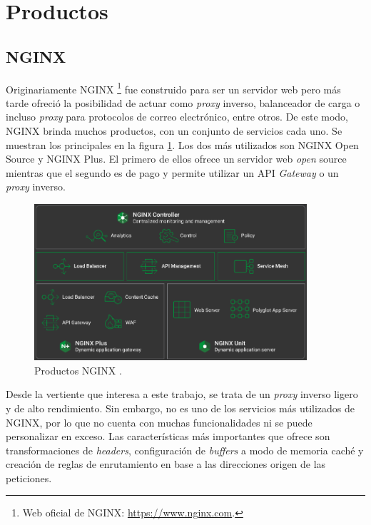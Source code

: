 \documentclass[11pt,spanish,listoffigures]{tfgetsinf}
\begin{document}

	\section{Productos}


		\subsection{NGINX}

Originariamente NGINX \footnote{Web oficial de NGINX: \url{https://www.nginx.com}.} fue construido para ser un servidor web pero más tarde ofreció la posibilidad de actuar como \emph{proxy} inverso, balanceador de carga o incluso \emph{proxy} para protocolos de correo electrónico, entre otros. De este modo, NGINX brinda muchos productos, con un conjunto de servicios cada uno. Se muestran los principales en la figura \ref{productosNGINX}. Los dos más utilizados son NGINX Open Source y NGINX Plus. El primero de ellos ofrece un servidor web \emph{open} source mientras que el segundo es de pago y permite utilizar un API \emph{Gateway} o un \emph{proxy} inverso.

\begin{figure}[ht]
\centering
\includegraphics[width=0.9\textwidth]{imagenes/productosNGINX}
\caption[Productos NGINX.]{Productos NGINX \cite{NGINX}.}
	\label{productosNGINX}
\end{figure}

Desde la vertiente que interesa a este trabajo, se trata de un \emph{proxy} inverso ligero y de alto rendimiento. Sin embargo, no es uno de los servicios más utilizados de NGINX, por lo que no cuenta con muchas funcionalidades ni se puede personalizar en exceso. Las características más importantes que ofrece son transformaciones de \emph{headers}, configuración de \emph{buffers} a modo de memoria caché y creación de reglas de enrutamiento en base a las direcciones origen de las peticiones.
\end{document}
